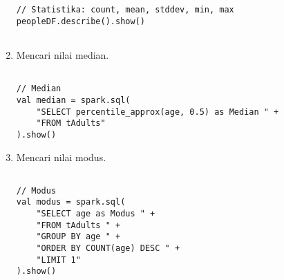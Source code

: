 \begin{enumerate}
\begin{lstlisting}[basicstyle=\ttfamily, frame=single,
	columns=fullflexible, keepspaces=true, breaklines=true, label=ls_kepatuhan_1_1_1_logo_sharif_judge, caption=Main method]
// Statistika: count, mean, stddev, min, max
peopleDF.describe().show()
    
\end{lstlisting}

\item Mencari nilai median.
\begin{lstlisting}[basicstyle=\ttfamily, frame=single,
	columns=fullflexible, keepspaces=true, breaklines=true, label=ls_kepatuhan_1_1_1_logo_sharif_judge, caption=Main method]
	
// Median
val median = spark.sql(
	"SELECT percentile_approx(age, 0.5) as Median " +
	"FROM tAdults"
).show()

\end{lstlisting}

\newpage
\item Mencari nilai modus.
\begin{lstlisting}[basicstyle=\ttfamily, frame=single,
	columns=fullflexible, keepspaces=true, breaklines=true, label=ls_kepatuhan_1_1_1_logo_sharif_judge, caption=Main method]
	
// Modus
val modus = spark.sql( 
 	"SELECT age as Modus " +
	"FROM tAdults " +
	"GROUP BY age " +
	"ORDER BY COUNT(age) DESC " +
	"LIMIT 1"
).show()

\end{lstlisting}

\end{enumerate}


